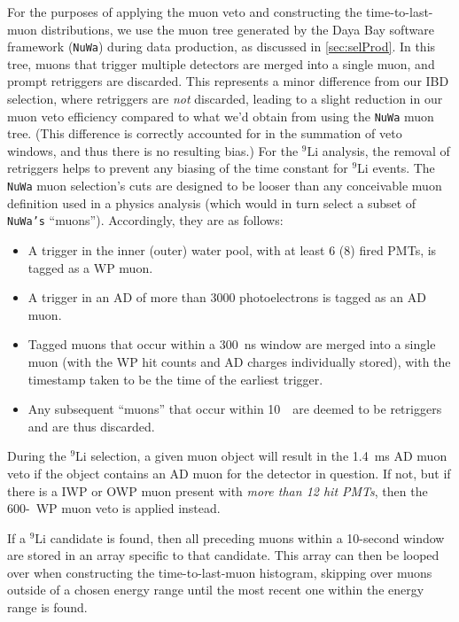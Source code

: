 \documentclass[../thesis.tex]{subfiles}
\begin{document}
For the purposes of applying the muon veto and constructing the time-to-last-muon distributions, we use the muon tree generated by the Daya Bay software framework (\texttt{NuWa}) during data production, as discussed in \autoref{sec:selProd}. In this tree, muons that trigger multiple detectors are merged into a single muon, and prompt retriggers are discarded. This represents a minor difference from our IBD selection, where retriggers are \emph{not} discarded, leading to a slight reduction in our muon veto efficiency compared to what we'd obtain from using the \texttt{NuWa} muon tree. (This difference is correctly accounted for in the summation of veto windows, and thus there is no resulting bias.) For the $^9$Li analysis, the removal of retriggers helps to prevent any biasing of the time constant for $^9$Li events. The \texttt{NuWa} muon selection's cuts are designed to be looser than any conceivable muon definition used in a physics analysis (which would in turn select a subset of \texttt{NuWa's} ``muons''). Accordingly, they are as follows:

\begin{itemize}
\item A trigger in the inner (outer) water pool, with at least 6 (8) fired PMTs, is tagged as a WP muon.
\item A trigger in an AD of more than 3000 photoelectrons is tagged as an AD muon.
\item Tagged muons that occur within a 300~ns window are merged into a single muon (with the WP hit counts and AD charges individually stored), with the timestamp taken to be the time of the earliest trigger.
\item Any subsequent ``muons'' that occur within 10~\us\ are deemed to be retriggers and are thus discarded.
\end{itemize}

During the $^9$Li selection, a given muon object will result in the 1.4~ms AD muon veto if the object contains an AD muon for the detector in question. If not, but if there is a IWP or OWP muon present with \emph{more than 12 hit PMTs}, then the 600-\us\ WP muon veto is applied instead.

If a $^9$Li candidate is found, then all preceding muons within a 10-second window are stored in an array specific to that candidate. This array can then be looped over when constructing the time-to-last-muon histogram, skipping over muons outside of a chosen energy range until the most recent one within the energy range is found.
\end{document}
